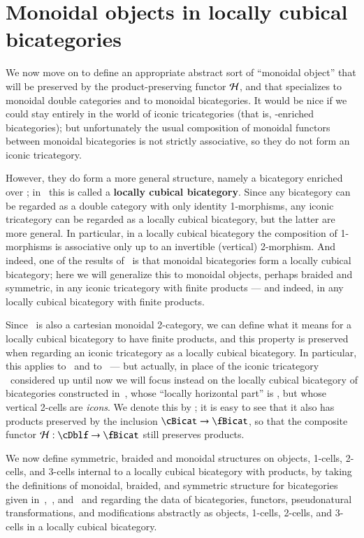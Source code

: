 \section{Monoidal objects in locally cubical bicategories}
\label{sec:mono-objects}

We now move on to define an appropriate abstract sort of ``monoidal object'' that will be preserved by the product-preserving functor $\mathcal{H}$, and that specializes to monoidal double categories and to monoidal bicategories.
It would be nice if we could stay entirely in the world of iconic tricategories (that is, \Icon-enriched bicategories); but unfortunately the usual composition of monoidal functors between monoidal bicategories is not strictly associative, so they do not form an iconic tricategory.

However, they do form a more general structure, namely a bicategory enriched over \cDbl; in~\cite{gg:ldstr-tricat} this is called a \textbf{locally cubical bicategory}.
Since any bicategory can be regarded as a double category with only identity 1-morphisms, any iconic tricategory can be regarded as a locally cubical bicategory, but the latter are more general.
In particular, in a locally cubical bicategory the composition of 1-morphisms is associative only up to an invertible (vertical) 2-morphism.
And indeed, one of the results of~\cite{gg:ldstr-tricat} is that monoidal bicategories form a locally cubical bicategory; here we will generalize this to monoidal objects, perhaps braided and symmetric, in any iconic tricategory with finite products --- and indeed, in any locally cubical bicategory with finite products.

Since \cDbl\ is also a cartesian monoidal 2-category, we can define what it means for a locally cubical bicategory to have finite products, and this property is preserved when regarding an iconic tricategory as a locally cubical bicategory.
In particular, this applies to \cDblf\ and to \cBicat\ --- but actually, in place of the iconic tricategory \cBicat\ considered up until now we will focus instead on the locally cubical bicategory of bicategories constructed in~\cite{gg:ldstr-tricat}, whose ``locally horizontal part'' is \cBicat, but whose vertical 2-cells are \emph{icons}.
We denote this by \fBicat; it is easy to see that it also has products preserved by the inclusion $\cBicat\to \fBicat$, so that the composite functor $\cH : \cDblf \to\fBicat$ still preserves products.

We now define symmetric, braided and monoidal structures on objects, 1-cells, 2-cells, and 3-cells internal to a locally cubical bicategory with products, by taking the definitions of monoidal, braided, and symmetric structure for bicategories given in~\cite{nick:tricatsbook},~\cite{mccrudden:bal-coalgb}, and~\cite{gg:ldstr-tricat} and regarding the data of bicategories, functors, pseudonatural transformations, and modifications abstractly as objects, 1-cells, 2-cells, and 3-cells in a locally cubical bicategory.

